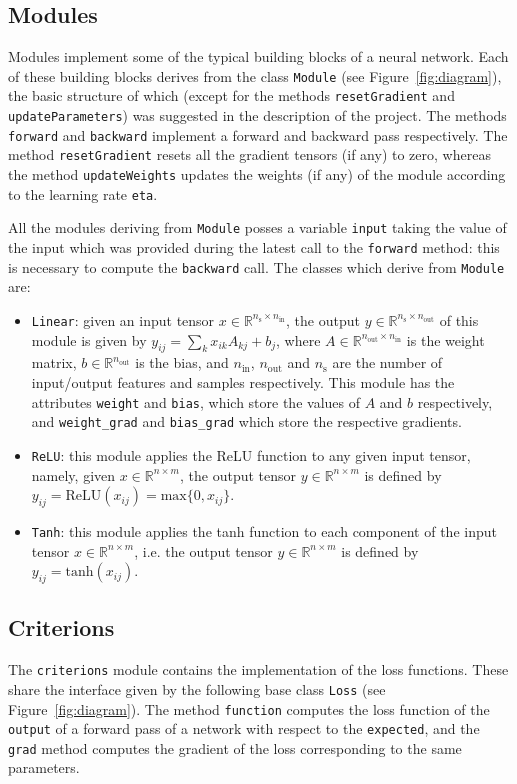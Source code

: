 \documentclass[10pt,final,a4paper]{article}
\begin{document}
\subsection{Modules}
Modules implement some of the typical building blocks of a neural network. Each of these building blocks derives from the class \verb|Module| (see Figure~\ref{fig:diagram}), the basic structure of which (except for the methods \verb|resetGradient| and \verb|updateParameters|) was suggested in the description of the project. The methods \verb|forward| and \verb|backward| implement a forward and backward pass respectively. The method \verb|resetGradient| resets all the gradient tensors (if any) to zero, whereas the method \verb|updateWeights| updates the weights (if any) of the module according to the learning rate \verb|eta|.

All the modules deriving from \verb|Module| posses a variable \verb|input| taking the value of the input which was provided during the latest call to the \verb|forward| method: this is necessary to compute  the \verb|backward| call.
The classes which derive from \verb|Module| are:
\begin{itemize}
\item \verb|Linear|: given an input tensor $x \in \mathbb{R}^{n_\text{s} \times n_\text{in}}$, the output $y \in \mathbb{R}^{n_\text{s} \times n_\text{out}}$ of this module is given by $y_{ij} = \sum_{k} x_{ik} A_{kj} + b_{j}$, where $A \in \mathbb{R}^{n_\text{out} \times n_\text{in}}$ is the weight matrix, $b \in \mathbb{R}^{n_\text{out}}$ is the bias, and $n_\text{in}$, $n_\text{out}$ and $n_\text{s}$ are the number of input/output features and samples respectively. This module has the attributes \verb|weight| and \verb|bias|, which store the values of $A$ and $b$ respectively, and \verb|weight_grad| and \verb|bias_grad| which store the respective gradients.
\item \verb|ReLU|:  this module applies the ReLU function to any given input tensor, namely, given $x \in \mathbb{R}^{n \times m}$, the output tensor $y \in \mathbb{R}^{n \times m}$ is defined by $y_{ij} = \text{ReLU}(x_{ij}) = \text{max}\{0, x_{ij}\}$.
\item \verb|Tanh|: this module applies the tanh function to each component of the input tensor $x \in \mathbb{R}^{n \times m}$, i.e. the output tensor  $y \in \mathbb{R}^{n \times m}$ is defined by $y_{ij} = \text{tanh}(x_{ij})$.
\end{itemize}
\subsection{Criterions}
The \verb|criterions| module contains the implementation of the loss functions. These share the interface given by the following base class \verb|Loss| (see Figure~\ref{fig:diagram}). The method \verb|function| computes the loss function of the \verb|output| of a forward pass of a network with respect to the \verb|expected|, and the \verb|grad| method computes the gradient of the loss corresponding to the same parameters.
\end{document}

